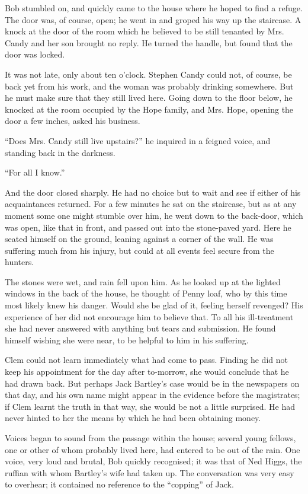 Bob stumbled on, and quickly came to the house where he hoped to find a
refuge. The door was, of course, open; he went in and groped his way up
the staircase. A knock at the door of the room which he believed to be
still tenanted by Mrs. Candy and her son brought no reply. He turned the
handle, but found that the door was locked.

It was not late, only about ten o'clock. Stephen Candy could not, of
course, be back yet from his work, and the woman was probably drinking
somewhere. But he must make sure that they still lived here. Going down
to the floor below, he knocked at the room occupied by the Hope family,
and Mrs. Hope, opening the door a few inches, asked his business.

``Does Mrs. Candy still live upstairs?'' he inquired in a feigned voice,
and standing back in the darkness.

{}``For all I know.''

And the door closed sharply. He had no choice but to wait and see if
either of his acquaintances returned. For a few minutes he sat on the
staircase, but as at any moment some one might stumble over him, he went
down to the back-door, which was open, like that in front, and passed
out into the stone-paved yard. Here he seated himself on the ground,
leaning against a corner of the wall. He was suffering much from his
injury, but could at all events feel secure from the hunters.

The stones were wet, and rain fell upon him. As he looked up at the
lighted windows in the back of the house, he thought of Penny loaf, who
by this time most likely knew his danger. Would she be glad of it,
feeling herself revenged? His experience of her did not encourage him to
believe that. To all his ill-treatment she had never answered with
anything but tears and submission. He found himself wishing she were
near, to be helpful to him in his suffering.

Clem could not learn immediately what had come to pass. Finding he did
not keep his {}appointment for the day after to-morrow, she would
conclude that he had drawn back. But perhaps Jack Bartley's case would
be in the newspapers on that day, and his own name might appear in the
evidence before the magistrates; if Clem learnt the truth in that way,
she would be not a little surprised. He had never hinted to her the
means by which he had been obtaining money.

Voices began to sound from the passage within the house; several young
fellows, one or other of whom probably lived here, had entered to be out
of the rain. One voice, very loud and brutal, Bob quickly recognised; it
was that of Ned Higgs, the ruffian with whom Bartley's wife had taken
up. The conversation was very easy to overhear; it contained no
reference to the ``copping'' of Jack.

